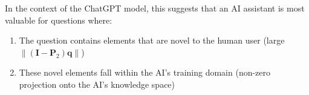 \documentclass[\ifdraft draft\fi]{article}
\begin{document}
In the context of the ChatGPT model, this suggests that an AI assistant is most valuable for questions where:
\begin{enumerate}
    \item The question contains elements that are novel to the human user (large $\|(\bm{I} - \bm{P}_2)\bm{q}\|$)
    \item These novel elements fall within the AI's training domain (non-zero projection onto the AI's knowledge space)
\end{enumerate}


\end{document}
